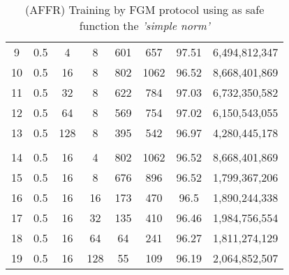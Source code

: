 \begin{table}[H]
\begin{tabular}{|c|c|c|c|c|c|c|c|}
        9                      & 0.5                   & 4                     & 8                     & 601                   & 657                   & 97.51                 & 6,494,812,347            \\
        10                     & 0.5                   & 16                    & 8                     & 802                   & 1062                  & 96.52                 & 8,668,401,869            \\
        11                     & 0.5                   & 32                    & 8                     & 622                   & 784                   & 97.03                 & 6,732,350,582            \\
        12                     & 0.5                   & 64                    & 8                     & 569                   & 754                   & 97.02                 & 6,150,543,055            \\
        13                     & 0.5                   & 128                   & 8                     & 395                   & 542                   & 96.97                 & 4,280,445,178            \\
        \hline
        \multicolumn{1}{|l|}{} & \multicolumn{1}{l|}{} & \multicolumn{1}{l|}{} & \multicolumn{1}{l|}{} & \multicolumn{1}{l|}{} & \multicolumn{1}{l|}{} & \multicolumn{1}{l|}{} & \multicolumn{1}{l|}{}    \\
        \hline
        14                     & 0.5                   & 16                    & 4                     & 802                   & 1062                  & 96.52                 & 8,668,401,869            \\
        15                     & 0.5                   & 16                    & 8                     & 676                   & 896                   & 96.52                 & 1,799,367,206            \\
        16                     & 0.5                   & 16                    & 16                    & 173                   & 470                   & 96.5                  & 1,890,244,338            \\
        17                     & 0.5                   & 16                    & 32                    & 135                   & 410                   & 96.46                 & 1,984,756,554            \\
        18                     & 0.5                   & 16                    & 64                    & 64                    & 241                   & 96.27                 & 1,811,274,129            \\
        19                     & 0.5                   & 16                    & 128                   & 55                    & 109                   & 96.19                 & 2,064,852,507            \\
        \hline
    \end{tabular}
    \caption{(AFFR) Training by FGM protocol using as safe function the \emph{'simple norm'}}
    \label{tab:table-fgm-sf1-nlp-exp}
\end{table}

